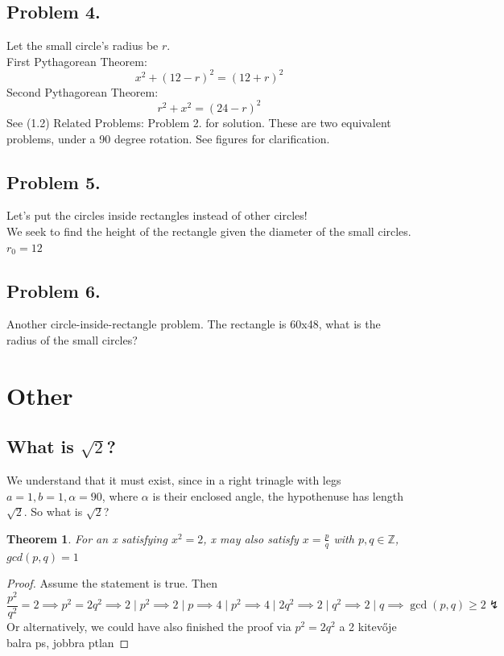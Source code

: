 \documentclass{article}
\newtheorem{theorem}{Theorem}
\begin{document}
\subsection{Problem 4.}
Let the small circle's radius be $r$.\\
First Pythagorean Theorem:
\begin{equation}
    x^2 + (12 - r)^2 = (12 + r)^2
\end{equation}
Second Pythagorean Theorem:
\begin{equation}
    r^2 + x^2 = (24-r)^2
\end{equation}
See (1.2) Related Problems: Problem 2. for solution. These are two equivalent problems, under a 90 degree rotation. See figures for clarification.

\subsection{Problem 5.}
Let's put the circles inside rectangles instead of other circles!\\
We seek to find the height of the rectangle given the diameter of the small circles.\\
$r_0 = 12$

\subsection{Problem 6.}
Another circle-inside-rectangle problem. The rectangle is 60x48, what is the radius of the small circles?

\section{Other}
\subsection{What is $\sqrt{2}$?}
We understand that it must exist, since in a right trinagle with legs $a = 1, b= 1, \alpha = 90$, where $\alpha$ is their enclosed angle, the hypothenuse has length $\sqrt{2}$. So what is $\sqrt{2}$?
\\
\begin{theorem}
    For an x satisfying $x^2 = 2$, x may also satisfy $x = \frac{p}{q}$ with $p, q \in \mathbb{Z}$, $gcd(p, q) = 1$
\end{theorem}
\begin{proof}
    Assume the statement is true. Then
    \begin{equation}
        \frac{p^2}{q^2} = 2 \implies p^2 = 2q^2 \implies 2 \mid p^2 \implies 2 \mid p \implies 4 \mid p^2 \implies 4 \mid 2q^2 \implies 2 \mid q^2 \implies 2 \mid q \implies \gcd(p, q) \ge 2 \lightning
    \end{equation}
    Or alternatively, we could have also finished the proof via
    $p^2 = 2q^2$ a 2 kitevője balra ps, jobbra ptlan
\end{proof}
\end{document}
